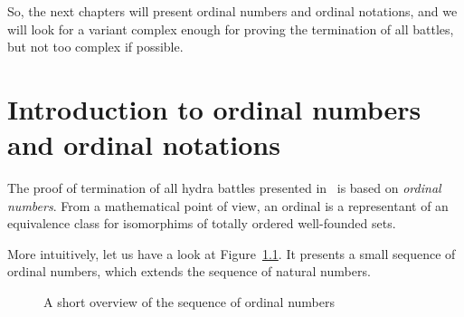 \documentclass[a4paper]{book}
\begin{document}
So, the next chapters will present ordinal numbers and ordinal notations, and we will
look for a variant complex enough for proving the termination of all battles, but not too complex if possible.




\chapter{Introduction to ordinal numbers and ordinal notations}


The proof of termination of all hydra battles presented in~\cite{KP82} is based
on \emph{ordinal numbers}.
From a mathematical point of view, an ordinal is a representant of an equivalence class for isomorphims of  totally ordered well-founded sets.

More intuitively, let us have a look at Figure~\ref{fig:ordinal-sequence}. It presents a small sequence of ordinal numbers, which extends the sequence of natural numbers. 




\begin{figure}[h]
  \centering
{}
 
 
  \caption{A short overview of the sequence of ordinal numbers}
  \label{fig:ordinal-sequence}
\end{figure}
\end{document}
